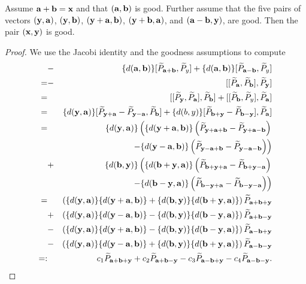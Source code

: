 \begin{lemma}\label{lemma_trueforab}
	Assume ${\mathbf{a}} + {\mathbf{b}} = {\mathbf{x}}$ and that $({\mathbf{a}},{\mathbf{b}})$ is good. Further assume that the five pairs of vectors $({\mathbf{y}}, {\mathbf{a}})$, $({\mathbf{y}}, {\mathbf{b}})$, $({\mathbf{y}}+{\mathbf{a}},{\mathbf{b}})$, $({\mathbf{y}}+{\mathbf{b}},{\mathbf{a}})$, and $({\mathbf{a}}-{\mathbf{b}}, {\mathbf{y}})$, are good. Then the pair $({\mathbf{x}},{\mathbf{y}})$ is good.
\end{lemma}
\begin{proof}
We  use the Jacobi identity and the goodness assumptions to compute
	\begin{eqnarray*}
&-&\{d(\aab, \bb)\} [\widetilde{P}_{\aab+\bb}, \widetilde{P}_y] + \{d(\aab, \bb)\} [\widetilde{P}_{\aab-\bb}, \widetilde{P}_y] \\
=&-&[[\widetilde{P}_{\aab}, \widetilde{P}_{\bb}], \widetilde{P}_{\yy}] \\
=&&[[\widetilde{P}_{\yy}, \widetilde{P}_{\aab}], \widetilde{P}_{\bb}] + [[\widetilde{P}_{\bb}, \widetilde{P}_y], \widetilde{P}_{\aab}] \\
=&&\{d(\yy, \aab)\} [\widetilde{P}_{\yy+\aab} - \widetilde{P}_{\yy-\aab}, \widetilde{P}_{\bb}] + \{d(b,y)\} [\widetilde{P}_{\bb+\yy} - \widetilde{P}_{\bb-\yy}], \widetilde{P}_{\aab}] \\
=&&\{d(\yy,\aab)\} \left( \{d(\yy+\aab, \bb)\} \left( \widetilde{P}_{\yy+\aab+\bb} - \widetilde{P}_{\yy+\aab-\bb} \right) \right. \\
&& \left. \qquad\qquad -\{d(\yy-\aab,\bb)\} \left( \widetilde{P}_{\yy-\aab+\bb} - \widetilde{P}_{\yy-\aab-\bb} \right) \right) \\
&+&\{d(\bb,\yy)\} \left( \{d(\bb+\yy, \aab)\} \left( \widetilde{P}_{\bb+\yy+\aab} - \widetilde{P}_{\bb+\yy-\aab} \right) \right. \\
&& \left. \qquad\qquad -\{d(\bb-\yy, \aab)\} \left( \widetilde{P}_{\bb-\yy+\aab} - \widetilde{P}_{\bb-\yy-\aab} \right) \right) \\
=&& \left( \{d(\yy,\aab)\} \{d(\yy+\aab,\bb)\} + \{d(\bb,\yy)\} \{d(\bb+\yy,\aab)\} \right) \widetilde{P}_{\aab+\bb+\yy} \\
&+& \left( \{d(\yy,\aab)\} \{d(\yy-\aab,\bb)\} - \{d(\bb,\yy)\} \{d(\bb-\yy,\aab)\} \right) \widetilde{P}_{\aab+\bb-\yy} \\
&-& \left( \{d(\yy,\aab)\} \{d(\yy+\aab,\bb)\} - \{d(\bb,\yy)\} \{d(\bb-\yy,\aab)\} \right) \widetilde{P}_{\aab-\bb+\yy} \\
&-& \left( \{d(\yy,\aab)\} \{d(\yy-\aab,\bb)\} + \{d(\bb,\yy)\} \{d(\bb+\yy,\aab)\} \right) \widetilde{P}_{\aab-\bb-\yy} \\
=:&& c_1 \widetilde{P}_{\aab+\bb+\yy} + c_2 \widetilde{P}_{\aab+\bb-\yy} - c_3 \widetilde{P}_{\aab-\bb+\yy} - c_4 \widetilde{P}_{\aab-\bb-\yy}.

\end{eqnarray*}
\end{proof}
